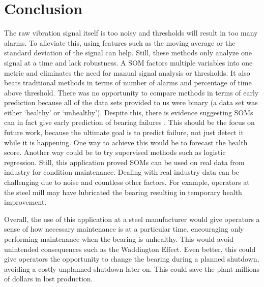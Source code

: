 \section{Conclusion}


The raw vibration signal itself is too noisy and thresholds will result in too many alarms.
To alleviate this, using features such as the moving average or the standard deviation of the signal can help.
Still, these methods only analyze one signal at a time and lack robustness.
A SOM factors multiple variables into one metric and eliminates the need for manual signal analysis or thresholds.
It also beats traditional methods in terms of number of alarms and percentage of time above threshold.
There was no opportunity to compare methods in terms of early prediction because all of the data sets provided to us were binary (a data set was either `healthy' or `unhealthy').
Despite this, there is evidence suggesting SOMs can in fact give early prediction of bearing failures \cite{Tian2014AnomalyDU} \cite{som-1}.
This should be the focus on future work, because the ultimate goal is to predict failure, not just detect it while it is happening.
One way to achieve this would be to forecast the health score.
Another way could be to try supervised methods such as logistic regression.
Still, this application proved SOMs can be used on real data from industry for condition maintenance.
Dealing with real industry data can be challenging due to noise and countless other factors.
For example, operators at the steel mill may have lubricated the bearing resulting in temporary health improvement.

Overall, the use of this application at a steel manufacturer would give operators a sense of how necessary maintenance is at a particular time,
encouraging only performing maintenance when the bearing is unhealthy.
This would avoid unintended consequences such as the Waddington Effect.
Even better, this could give operators the opportunity to change the bearing during a planned shutdown, avoiding a costly unplanned shutdown later on. 
This could save the plant millions of dollars in lost production.